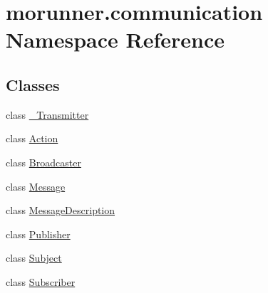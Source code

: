 \hypertarget{namespacemorunner_1_1communication}{}\section{morunner.\+communication Namespace Reference}
\label{namespacemorunner_1_1communication}
\subsection*{Classes}
\begin{DoxyCompactItemize}
\item 
class \hyperlink{classmorunner_1_1communication_1_1__Transmitter}{\+\_\+\+Transmitter}
\item 
class \hyperlink{classmorunner_1_1communication_1_1Action}{Action}
\item 
class \hyperlink{classmorunner_1_1communication_1_1Broadcaster}{Broadcaster}
\item 
class \hyperlink{classmorunner_1_1communication_1_1Message}{Message}
\item 
class \hyperlink{classmorunner_1_1communication_1_1MessageDescription}{Message\+Description}
\item 
class \hyperlink{classmorunner_1_1communication_1_1Publisher}{Publisher}
\item 
class \hyperlink{classmorunner_1_1communication_1_1Subject}{Subject}
\item 
class \hyperlink{classmorunner_1_1communication_1_1Subscriber}{Subscriber}
\end{DoxyCompactItemize}
